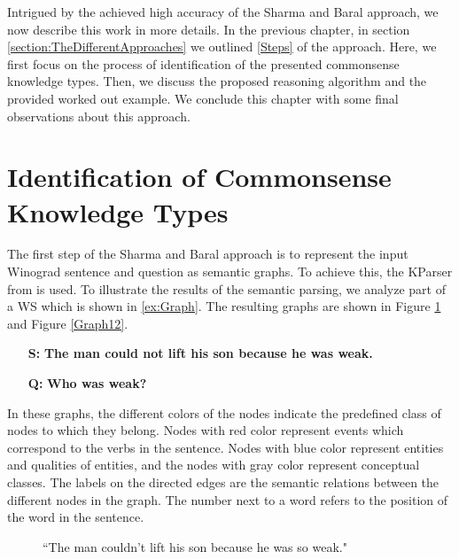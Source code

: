 \label{knowledge_types}
Intrigued by the achieved high accuracy of the Sharma and Baral \cite{2018CommonsenseKT} approach, we now describe this work in more details. In the previous chapter, in section \ref{section:TheDifferentApproaches} we outlined \underline{\ref{Steps}} of the approach. Here, we first focus on the process of identification of the presented commonsense knowledge types. Then, we discuss the proposed reasoning algorithm and the provided worked out example. We conclude this chapter with some final observations about this approach.


\section{Identification of Commonsense Knowledge Types}
The first step of the Sharma and Baral \cite{2018CommonsenseKT} approach is to represent the input Winograd sentence and question as semantic graphs. To achieve this, the KParser from \cite{DBLP:conf/ijcai/SharmaVAB15} is used. 
To illustrate the results of the semantic parsing, we analyze part of a WS which is shown in \ref{ex:Graph}. The  resulting graphs are shown in Figure \ref{Graph11} and Figure \ref{Graph12}. \\ 
\begin{itemize}
	\item[\textbf{S:}] \textbf{The man could not lift his son because he was weak.}
	\item[\textbf{Q:}] \textbf{Who was weak?}
\end{itemize}

In these graphs, the different colors of the nodes indicate the predefined class of nodes to which they belong. 
Nodes with red color represent events which correspond to the verbs in the sentence. Nodes with blue color represent entities and qualities of entities, and the nodes with gray color represent conceptual classes. The labels on the directed edges are the semantic relations between the different nodes in the graph. The number next to a word refers to the position of the word in the sentence. 
\begin{figure} [h!]
	\centering
	
	\caption{\label{Graph11}``The man couldn't lift his son because he was so weak."}
\end{figure}


